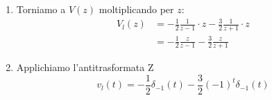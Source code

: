 \documentclass[a4paper]{article}
\begin{document}
\begin{example}
\begin{enumerate}
\[\begin{cases}
        A-B = 1
      \end{cases}
      \to 
      \begin{cases}
        A = -\frac{1}{2}\\
        B = -\frac{3}{2}
      \end{cases}
      \] 
    \item Torniamo a \( V(z) \) moltiplicando per \( z \):
      \[
        \begin{aligned}
          V_l(z) &= -\frac{1}{2} \frac{1}{z-1} \cdot z - \frac{3}{2} \frac{1}{z+1} \cdot z\\
                 &= -\frac{1}{2} \frac{z}{z-1} - \frac{3}{2} \frac{z}{z+1}
        \end{aligned}
      \] 
    \item Applichiamo l'antitrasformata Z
      \[
        v_l(t) = -\frac{1}{2} \delta_{-1}(t) - \frac{3}{2} (-1)^t \delta_{-1}(t)
      \] 
  \end{enumerate}
\end{example}
\end{document}

